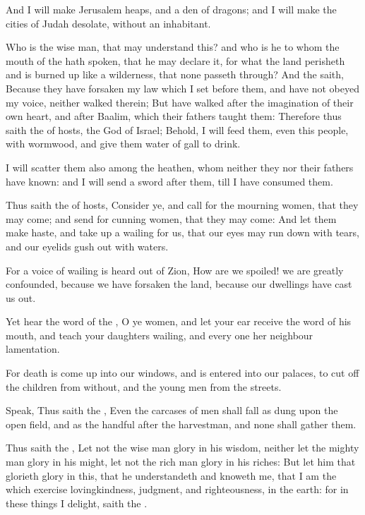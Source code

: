 \Verse And I will make Jerusalem heaps, and a den of dragons; and I will make the cities of Judah desolate, without an inhabitant.

\Verse Who is the wise man, that may understand this? and who is he to whom the mouth of the \LORD hath spoken, that he may declare it, for what the land perisheth and is burned up like a wilderness, that none passeth through?  \Verse And the \LORD saith, Because they have forsaken my law which I set before them, and have not obeyed my voice, neither walked therein; \Verse But have walked after the imagination of their own heart, and after Baalim, which their fathers taught them: \Verse Therefore thus saith the \LORD of hosts, the God of Israel; Behold, I will feed them, even this people, with wormwood, and give them water of gall to drink.

\Verse I will scatter them also among the heathen, whom neither they nor their fathers have known: and I will send a sword after them, till I have consumed them.

\Verse Thus saith the \LORD of hosts, Consider ye, and call for the mourning women, that they may come; and send for cunning women, that they may come: \Verse And let them make haste, and take up a wailing for us, that our eyes may run down with tears, and our eyelids gush out with waters.

\Verse For a voice of wailing is heard out of Zion, How are we spoiled!  we are greatly confounded, because we have forsaken the land, because our dwellings have cast us out.

\Verse Yet hear the word of the \LORD, O ye women, and let your ear receive the word of his mouth, and teach your daughters wailing, and every one her neighbour lamentation.

\Verse For death is come up into our windows, and is entered into our palaces, to cut off the children from without, and the young men from the streets.

\Verse Speak, Thus saith the \LORD, Even the carcases of men shall fall as dung upon the open field, and as the handful after the harvestman, and none shall gather them.

\Verse Thus saith the \LORD, Let not the wise man glory in his wisdom, neither let the mighty man glory in his might, let not the rich man glory in his riches: \Verse But let him that glorieth glory in this, that he understandeth and knoweth me, that I am the \LORD which exercise lovingkindness, judgment, and righteousness, in the earth: for in these things I delight, saith the \LORD.

